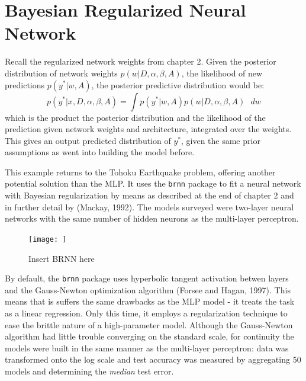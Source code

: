 \section{Bayesian Regularized Neural Network}

Recall the regularized network weights from chapter 2. Given the posterior distribution of network weights $p(w|D,\alpha,\beta,A)$, the likelihood of new predictions $p(y^*|w,A)$, the posterior predictive distribution would be:
$$
p(y^*|x,D,\alpha,\beta,A) = \int p(y^*|w,A) p(w|D,\alpha,\beta,A) \text{ } dw
$$
which is the product the posterior distribution and the likelihood of the prediction given network weights and architecture, integrated over the weights.  This gives an output predicted distribution of $y^*$, given the same prior assumptions as went into building the model before.

This example returns to the Tohoku Earthquake problem, offering another potential solution than the MLP.  It uses the \texttt{brnn} package \cite{brnn} to fit a neural network with Bayesian regularization by means as described at the end of chapter 2 and in further detail by (Mackay, 1992).
The models surveyed were two-layer neural networks with the same number of hidden neurons as the multi-layer perceptron.

\begin{figure}[H]
    \center
    \texttt{[image: ]}
    \caption{\footnotesize{Insert BRNN here}}
    \label{tohoku_unfit}
\end{figure}

By default, the \texttt{brnn} package uses hyperbolic tangent activation betwen layers and the Gauss-Newton optimization algorithm (Forsee and Hagan, 1997).  This means that is suffers the same drawbacks as the MLP model - it treats the task as a linear regression.  Only this time, it employs a regularization technique to ease the brittle nature of a high-parameter model.
Although the Gauss-Newton algorithm had little trouble converging on the standard scale, for continuity the models were built in the same manner as the multi-layer perceptron: data was transformed onto the log scale and test accuracy was measured by aggregating 50 models and determining the \textit{median} test error.

